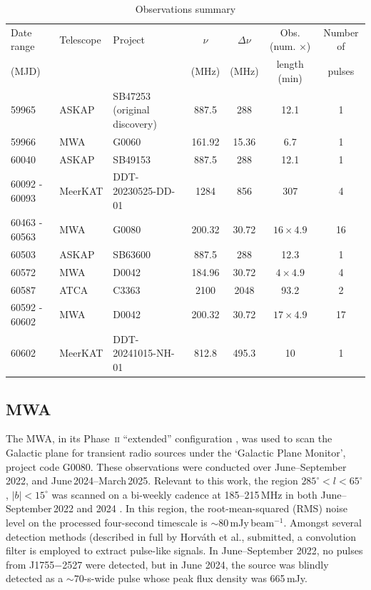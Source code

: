 \documentclass[fleqn,usenatbib]{mnras}
\newcommand{\src}{J1755$-$2527}
\begin{document}
\begin{table}
  \centering
  \caption{Observations summary}
  \label{tbl:obs}
  \begin{tabular}{lllcccc}
    \hline
    Date range & Telescope & Project & $\nu$ & $\Delta\nu$ & Obs. (num. $\times$) & Number of \\ 
    (MJD) & & & (MHz) & (MHz) & length (min) & pulses \\
    \hline 
    59965 & ASKAP & SB47253 (original discovery) & 887.5 & 288 & 12.1 & 1 \\
    59966 & MWA & G0060 & 161.92 & 15.36 & 6.7 & 1 \\
    60040  & ASKAP & SB49153 & 887.5 & 288 & 12.1 & 1 \\
    60092 - 60093 & MeerKAT & DDT-20230525-DD-01 & 1284 & 856 & 307 & 4 \\
    60463 - 60563 & MWA & G0080 & 200.32 & 30.72 & $16 \times 4.9$ & 16 \\
    60503 & ASKAP & SB63600 & 887.5 & 288 & 12.3 & 1 \\
    60572 & MWA & D0042 & 184.96 & 30.72 & $4 \times 4.9$ & 4 \\
    60587 & ATCA & C3363 & 2100 & 2048 & 93.2 & 2 \\
    60592 - 60602 & MWA & D0042 & 200.32 & 30.72 & $17 \times 4.9$ & 17 \\
    60602 & MeerKAT & DDT-20241015-NH-01 & 812.8 & 495.3 & 10 & 1 \\
    \hline
  \end{tabular}
\end{table}

\subsection{MWA} \label{sec:mwa}

The MWA, in its Phase~\textsc{ii} ``extended'' configuration \citep[][]{2018PASA...35...33W}, was used to scan the Galactic plane for transient radio sources under the `Galactic Plane Monitor', project code G0080. These observations were conducted over June--September\,2022, and June\,2024--March\,2025. Relevant to this work, the region $285^\circ < l < 65^\circ$, $|b| < 15^\circ$ was scanned on a bi-weekly cadence at 185--215\,MHz in both June--September\,2022 and 2024 \citep[see Methods of][a full description will be released by Hurley-Walker et al., in prep]{2023Natur.619..487H}. In this region, the root-mean-squared (RMS) noise level on the processed four-second timescale is $\sim$80\,mJy\,beam$^{-1}$. Amongst several detection methods (described in full by Horv\'ath et al., submitted, a convolution filter is employed to extract pulse-like signals. In June--September 2022, no pulses from \src{} were detected, but in June 2024, the source was blindly detected as a ${\sim}70$-s-wide pulse whose peak flux density was 665\,mJy.
\end{document}
